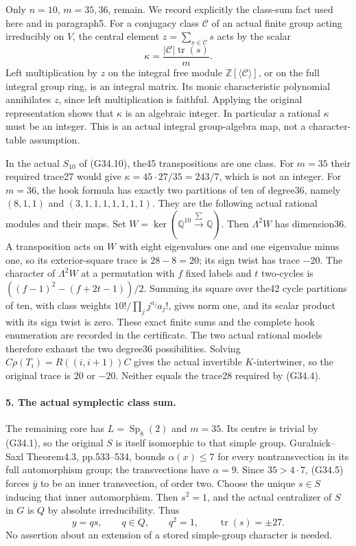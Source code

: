 Only \(n=10\), \(m=35,36\), remain. We record explicitly the
class-sum fact used here and in paragraph5. For a conjugacy class
\(\mathcal C\) of an actual finite group acting irreducibly on
\(V\), the central element \(z=\sum_{s\in\mathcal C}s\)
acts by the scalar
\[
           \kappa=\frac{|\mathcal C|\operatorname{tr}(s)}m.
                                                               \tag{G34.11}
\]
Left multiplication by \(z\) on the integral free module
\(\mathbb Z[\langle\mathcal C\rangle]\), or on the full
integral group ring, is an integral matrix. Its monic
characteristic polynomial annihilates \(z\), since left
multiplication is faithful. Applying the original representation
shows that \(\kappa\) is an algebraic integer. In particular a
rational \(\kappa\) must be an integer. This is an actual
integral group-algebra map, not a character-table assumption.

In the actual \(S_{10}\) of (G34.10), the45 transpositions are
one class. For \(m=35\) their required trace27 would give
\(\kappa=45\cdot27/35=243/7\), which is not an integer.
For \(m=36\), the hook formula has exactly two partitions of
ten of degree36, namely \((8,1,1)\) and \((3,1,1,1,1,1,1,1)\).
They are the following actual rational modules and their maps.
Set \(W=\ker(\mathbb Q^{10}\xrightarrow{\sum}\mathbb Q)\).
Then \(\Lambda^2W\) has dimension36. A transposition acts on
\(W\) with eight eigenvalues one and one eigenvalue minus one,
so its exterior-square trace is \(28-8=20\); its sign twist
has trace \(-20\). The character of \(\Lambda^2W\) at a
permutation with \(f\) fixed labels and \(t\) two-cycles is
\(((f-1)^2-(f+2t-1))/2\). Summing its square over the42 cycle
partitions of ten, with class weights
\(10!/\prod_j j^{a_j}a_j!\), gives norm one, and its scalar
product with its sign twist is zero. These exact finite sums
and the complete hook enumeration are recorded in the certificate.
The two actual rational models therefore exhaust the two
degree36 possibilities. Solving
\(C\rho(T_i)=R((i,i+1))C\) gives the actual invertible
\(K\)-intertwiner, so the original trace is \(20\) or \(-20\).
Neither equals the trace28 required by (G34.4).

\paragraph{5. The actual symplectic class sum.}
The remaining core has \(L=\operatorname{Sp}_8(2)\) and
\(m=35\). Its centre is trivial by (G34.1), so the original
\(S\) is itself isomorphic to that simple group.
Guralnick--Saxl Theorem4.3, pp.533--534, bounds
\(\alpha(x)\le7\) for every nontransvection in its full
automorphism group; the transvections have \(\alpha=9\).
Since \(35>4\cdot7\), (G34.5) forces \(\bar y\) to be an
inner transvection, of order two. Choose the unique \(s\in S\)
inducing that inner automorphism. Then \(s^2=1\), and the
actual centralizer of \(S\) in \(G\) is \(Q\) by absolute
irreducibility. Thus
\[
                     y=q s,\qquad q\in Q,\qquad q^2=1,
                 \qquad\operatorname{tr}(s)=\pm27.       \tag{G34.12}
\]
No assertion about an extension of a stored simple-group
character is needed.


